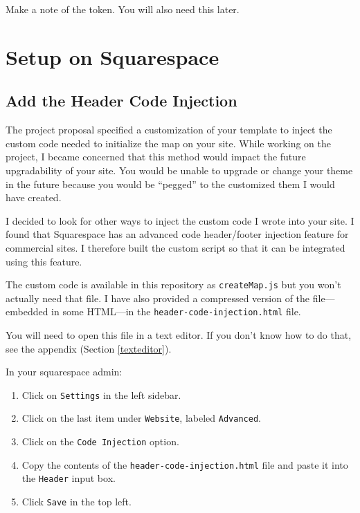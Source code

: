 \documentclass[11pt]{article}
\begin{document}
Make a note of the token. You will also need this later.

\label{access}

\section{Setup on Squarespace}

\subsection{Add the Header Code Injection}

The project proposal specified a customization of your template to
inject the custom code needed to initialize the map on your
site. While working on the project, I became concerned that this
method would impact the future upgradability of your site. You would
be unable to upgrade or change your theme in the future because you
would be ``pegged'' to the customized them I would have created.

I decided to look for other ways to inject the custom code I wrote
into your site. I found that Squarespace has an advanced code
header/footer injection feature for commercial sites. I therefore
built the custom script so that it can be integrated using this
feature.

The custom code is available in this repository as
\texttt{createMap.js} but you won't actually need that file. I have
also provided a compressed version of the file---embedded in some
HTML---in the \texttt{header-code-injection.html} file.

You will need to open this file in a text editor. If you don't know
how to do that, see the appendix (Section \ref{texteditor}).

In your squarespace admin:

\begin{enumerate}
\item Click on \texttt{Settings} in the left sidebar.
\item Click on the last item under \texttt{Website}, labeled \texttt{Advanced}.
\item Click on the \texttt{Code Injection} option.
\item Copy the contents of the \texttt{header-code-injection.html}
  file and paste it into the \texttt{Header} input box.
\item Click \texttt{Save} in the top left. 
\end{enumerate}
\end{document}
